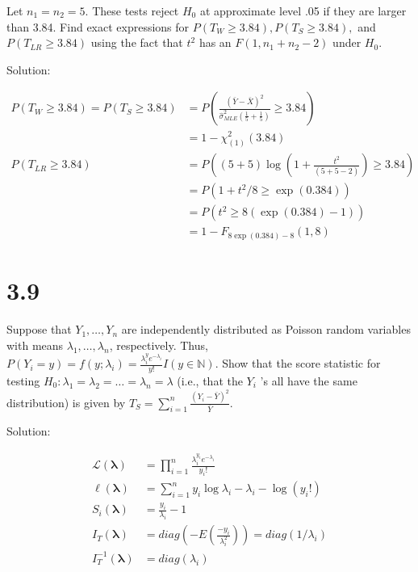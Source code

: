 \documentclass[
  letterpaper,
  DIV=11,
  numbers=noendperiod]{scrreprt}
\begin{document}
Let \(n_1= n_2=5\). These tests reject \(H_0\) at approximate level .05
if they are larger than 3.84. Find exact expressions for
\(P(T_W \geq 3.84), P(T_S \geq 3.84),\) and \(P(T_{LR} \geq 3.84)\)
using the fact that \(t^2\) has an \(F(1,n_1+n_2-2)\) under \(H_0\).

Solution:

\[\begin{aligned}
P(T_W \geq 3.84)= P(T_S \geq 3.84) &= P\left(\frac{(\bar Y- \bar X)^2}{\hat \sigma^2_{MLE} \left(\frac 1 {5} +\frac 1 {5}\right)} \geq 3.84\right) \\
&= 1-\chi^2_{(1)}(3.84) \\
P(T_{LR} \geq 3.84) &= P\left((5+5) \log \left(1+\frac{t^2}{(5+5-2)} \right) \geq 3.84\right) \\
&= P\left(1+t^2/8  \geq \exp(0.384)\right)\\
&= P\left(t^2  \geq 8(\exp(0.384)-1)\right)\\
&= 1-F_{8\exp(0.384)-8}(1,8)
\end{aligned}\]

\newpage

\hypertarget{section-22}{%
\section{3.9}\label{section-22}}

Suppose that \(Y_1,\dots, Y_n\) are independently distributed as Poisson
random variables with means \(\lambda_1, \dots, \lambda_n\),
respectively. Thus,
\(P(Y_i=y) = f(y;\lambda_i) =\frac{\lambda_i^y e^{-\lambda_i}}{y!}I(y \in \mathbb N)\).
Show that the score statistic for testing
\(H_0: \lambda_1 = \lambda_2 = \dots = \lambda_n=\lambda\) (i.e., that
the \(Y_i\) 's all have the same distribution) is given by
\(T_S = \sum_{i=1}^n \frac{(Y_i-\bar Y)^2}{\bar Y}\).

Solution:

\[\begin{aligned}
\mathcal L(\boldsymbol \lambda) &=\prod_{i=1}^n \frac{\lambda_i^{y_i} e^{-\lambda_i}}{y_i!} \\
\ell (\boldsymbol \lambda) &=\sum_{i=1}^n y_i \log \lambda_i -\lambda_i -\log(y_i!) \\
S_i (\boldsymbol \lambda) &= \frac {y_i} {\lambda_i}-1 \\
I_T (\boldsymbol \lambda) &= diag\left(-E\left(\frac{-y_i}{\lambda_i^2}\right)\right) = diag(1/\lambda_i) \\
I_T^{-1} (\boldsymbol \lambda)&= diag(\lambda_i)
\end{aligned}\]
\end{document}
